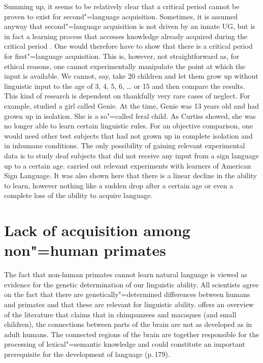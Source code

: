 Summing up, it seems to be relatively clear that a critical period cannot be proven to exist for second"=language acquisition. Sometimes, it is assumed anyway that second"=language acquisition
is not driven by an innate UG, but is in fact a learning process that accesses knowledge already
acquired during the critical period \citep[]{Lenneberg67a-u}.
One would therefore have to show that there is a critical period for first"=language
acquisition. This is, however, not straightforward as, for ethical reasons, one cannot experimentally
manipulate the point at which the input is available. We cannot, say, take 20 children and let them grow up without linguistic input to the age
of 3, 4, 5, 6, \ldots{} or 15 and then compare the results. This kind of research is dependent on thankfully very rare cases of neglect. For example, \citet{Curtiss77a-u}
studied a girl called Genie. At the time, Genie was 13 years old and had grown up in isolation. She is a so"=called feral child.
As Curtiss showed, she was no longer able to learn certain linguistic rules. For an objective comparison, one would need other test subjects that had not grown up
in complete isolation and in inhumane conditions. The only possibility of gaining relevant
experimental data is to study deaf subjects that did not receive any input from a sign language up to a certain age. \citet[]{JN89a} carried out relevant experiments with learners of American Sign Language. It was also shown here that there is a linear
decline in the ability to learn, however nothing like a sudden drop after a certain age or even a complete loss of the ability to acquire language.

\section{Lack of acquisition among non"=human primates}

The fact that non-human primates cannot learn natural language is viewed as evidence for the genetic determination of our linguistic ability. All scientists agree on the fact that there are genetically"=determined
differences between humans and primates and that these are relevant for linguistic ability.
\citet{Friederici2009a} offers an overview of the literature that claims that in chimpanzees and macaques (and small children),
the connections between parts of the brain are not as developed as in adult humans. The connected regions of the brain are together responsible for
the processing of lexical"=semantic knowledge and could constitute an important prerequisite for the development of language (p.\,179).

